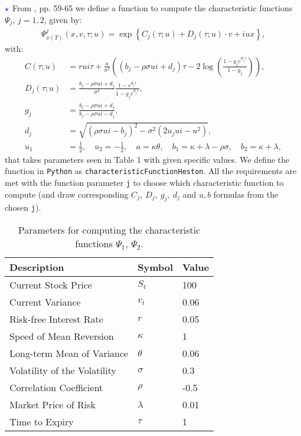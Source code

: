 \documentclass[11pt]{article}
\numberwithin{equation}{section}
\newcommand{\lc}{\left\{}
\newcommand{\rc}{\right\}}
\begin{document}
$\textcolor{blue}{\star}$ From \cite{Havrylenko2024}, pp. 59-65 we define a
function to compute the characteristic functions $\Psi_j$, $j=1,2$, given by:
\begin{align*}
    \Psi_{x(T)}^j(x,v,\tau ;u)=\exp \lc C_j (\tau; u) + D_j (\tau; u) \cdot v + i  u x \rc,
\end{align*}
with:
\begin{align*}
    C(\tau ; u) &= rui\tau + \frac{a}{\sigma^2}\left( (b_j - \rho\sigma ui + d_j) \tau - 2 \log \left( \frac{1 - g_j e^{d_j \tau}}{1 - g_j} \right) \right), \\
    D_j(\tau ; u) &= \frac{b_j - \rho \sigma ui + d_j}{\sigma^2} \frac{1 - e^{d_j \tau}}{1 - g_j e^{d_j \tau}}, \\
    g_j &= \frac{b_j - \rho\sigma ui + d_j}{b_j - \rho\sigma ui - d_j}, \\
    d_j &= \sqrt{(\rho\sigma ui - b_j)^2 - \sigma^2(2u_jui - u^2)},\\
    u_1 &= \frac{1}{2}, \quad u_2 = -\frac{1}{2}, \quad a = \kappa\theta, \quad b_1 = \kappa + \lambda - \rho\sigma, \quad b_2 = \kappa + \lambda,
\end{align*}
that takes parameters seen in Table 1 with given specific values. We define the
function in \texttt{Python} as \texttt{characteristicFunctionHeston}. All the
requirements are met with the function parameter \texttt{j} to choose which
characteristic function to compute (and draw corresponding
$C_j,\:D_j,\:g_j,\:d_j$ and $u,b$ formulas from the chosen \texttt{j}).
\begin{table}[!h]
    \centering
    \begin{tabular}{lll}
    \toprule
    \textbf{Description} & \textbf{Symbol} & \textbf{Value} \\
    \midrule
    Current Stock Price & $S_t$ & 100 \\
    Current Variance & $v_t$ & 0.06 \\
    Risk-free Interest Rate & $r$ & 0.05 \\
    Speed of Mean Reversion & $\kappa$ & 1 \\
    Long-term Mean of Variance & $\theta$ & 0.06 \\
    Volatility of the Volatility & $\sigma$ & 0.3 \\
    Correlation Coefficient & $\rho$ & -0.5 \\
    Market Price of Risk & $\lambda$ & 0.01 \\
    Time to Expiry & $\tau$ & 1 \\
    \bottomrule
    \end{tabular}
    \caption{Parameters for computing the characteristic functions $\Psi_1$, $\Psi_2$.}
    \label{table:characteristic_functions}
\end{table}
\end{document}
